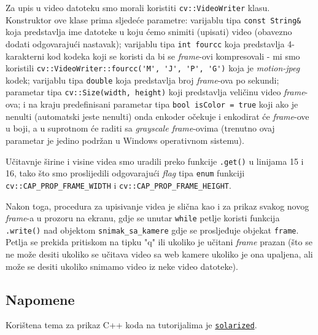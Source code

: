 \documentclass[a4paper, 12pt]{article}
\begin{document}
Za upis u video datoteku smo morali koristiti \lstinline{cv::VideoWriter} klasu. Konstruktor ove klase prima sljedeće parametre: varijablu tipa \lstinline{const String&} koja predstavlja ime datoteke u koju ćemo snimiti (upisati) video (obavezno dodati odgovarajući nastavak); varijablu tipa \lstinline{int fourcc} koja predstavlja 4-karakterni kod kodeka koji se koristi da bi se \textit{frame}-ovi kompresovali - mi smo koristili \lstinline{cv::VideoWriter::fourcc('M', 'J', 'P', 'G')} koja je \textit{motion-jpeg} kodek; varijablu tipa \lstinline{double} koja predstavlja broj \textit{frame}-ova po sekundi; parametar tipa \lstinline{cv::Size(width, height)} koji predstavlja veličinu video \textit{frame}-ova; i na kraju predefinisani parametar tipa \lstinline{bool isColor = true} koji ako je nenulti (automatski jeste nenulti) onda enkoder očekuje i enkodirat će \textit{frame}-ove u boji, a u suprotnom će raditi sa \textit{grayscale frame}-ovima (trenutno ovaj parametar je jedino podržan u Windows operativnom sistemu).

Učitavnje širine i visine videa smo uradili preko funkcije \lstinline{.get()} u linijama 15 i 16, tako što smo proslijedili odgovarajući \textit{flag} tipa \lstinline{enum} funkciji \lstinline{cv::CAP_PROP_FRAME_WIDTH} i \newline \lstinline{cv::CAP_PROP_FRAME_HEIGHT}.

Nakon toga, procedura za upisivanje videa je slična kao i za prikaz svakog novog \textit{frame}-a u prozoru na ekranu, gdje se unutar \lstinline{while} petlje koristi funkcija \lstinline{.write()} nad objektom \lstinline{snimak_sa_kamere} gdje se prosljeđuje objekat \lstinline{frame}. Petlja se prekida pritiskom na tipku "q" ili ukoliko je učitani \textit{frame} prazan (što se ne može desiti ukoliko se učitava video sa web kamere ukoliko je ona upaljena, ali može se desiti ukoliko snimamo video iz neke video datoteke).

\subsection*{Napomene}

Korištena tema za prikaz C++ koda na tutorijalima je \href{https://ethanschoonover.com/solarized/}{\lstinline{solarized}}\cite{solarized}.

\printbibliography
\end{document}
